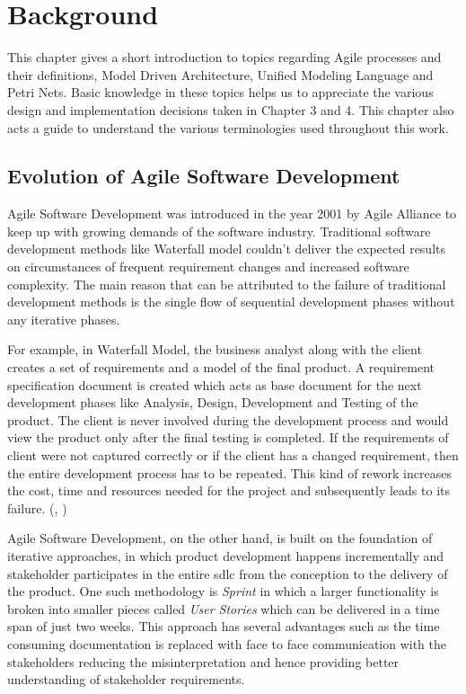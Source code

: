 \chapter{Background}\label{background} 
This chapter gives a short introduction to topics regarding Agile processes and their definitions, Model Driven Architecture, Unified Modeling Language and Petri Nets. Basic knowledge in these topics helps us to appreciate the various design and implementation decisions taken in Chapter 3 and 4. This chapter also acts a guide to understand the various terminologies used throughout this work.

\section{Evolution of Agile Software Development}
Agile Software Development was introduced in the year 2001 by Agile Alliance to keep up with growing demands of the software industry. Traditional software development methods like Waterfall model couldn’t deliver the expected results on circumstances of frequent requirement changes and increased software complexity. The main reason that can be attributed to the failure of traditional development methods is the single flow of sequential development phases without any iterative phases.

For example, in Waterfall Model, the business analyst along with the client creates a set of requirements and a model of the final product. A requirement specification document is created which acts as base document for the next development phases like Analysis, Design, Development and Testing of the product. The client is never involved during the development process and would view the product only after the final testing is completed. If the requirements of client were not captured correctly or if the client has a changed requirement, then the entire development process has to be repeated. This kind of rework increases the cost, time and resources needed for the project and subsequently leads to its failure. (\cite{versionone}, \cite{getzephyr})

Agile Software Development, on the other hand, is built on the foundation of iterative approaches, in which product development happens incrementally and stakeholder participates in the entire \gls{sdlc} from the conception to the delivery of the product. One such methodology is \textit{Sprint} in which a larger functionality is broken into smaller pieces called \textit{User Stories} which can be delivered in a time span of just two weeks. This approach has several advantages such as the time consuming documentation is replaced with face to face communication with the stakeholders reducing the misinterpretation and hence providing better understanding of stakeholder requirements.

